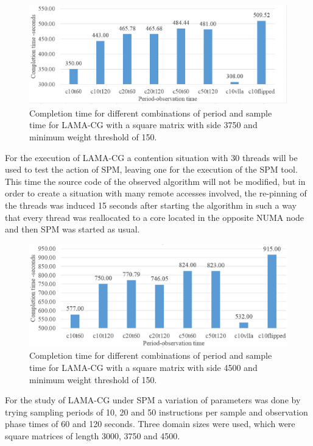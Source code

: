 \begin{figure}
	\centering
		\includegraphics[width=.7\textwidth]{figures/lam3k750.eps}
		\caption{Completion time for different combinations of period and sample time for LAMA-CG with a square matrix with side 3750 and minimum weight threshold of 150.}
		\label{fig:res-lamatim-3k45}
\end{figure}

For the execution of LAMA-CG a contention situation with 30 threads will be used to test the action of SPM, leaving one for the execution of the SPM tool. This time the source code of the observed algorithm will not be modified, but in order to create a situation with many remote accesses involved, the re-pinning of the threads was induced 15 seconds after starting the algorithm in such a way that every thread was reallocated to a core located in the opposite NUMA node and then SPM was started as usual.

\begin{figure}
	\centering
		\includegraphics[width=.7\textwidth]{figures/lam4k.eps}
		\caption{Completion time for different combinations of period and sample time for LAMA-CG with a square matrix with side 4500 and minimum weight threshold of 150.}
		\label{fig:res-lamatim-4k}
\end{figure}

For the study of LAMA-CG under SPM a variation of parameters was done by trying sampling periods of 10, 20 and 50 instructions per sample and observation phase times of 60 and 120 seconds. Three domain sizes were used, which were square matrices of length 3000, 3750 and 4500.


